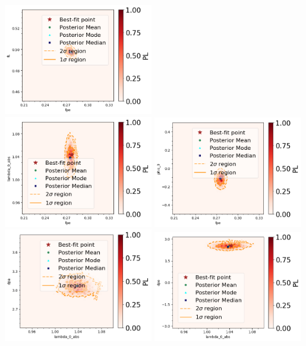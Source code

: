 \begin{center}
\includegraphics[width=0.49\textwidth]{figs/fpe_vs_fL.png}\\
\includegraphics[width=0.49\textwidth]{figs/fpe_vs_lambda_0_abs.png}
\includegraphics[width=0.49\textwidth]{figs/fpe_vs_phis_0.png}\\
\includegraphics[width=0.49\textwidth]{figs/lambda_0_abs_vs_dpa.png}
\includegraphics[width=0.49\textwidth]{figs/lambda_0_abs_vs_dpe.png}\\

\end{center}
